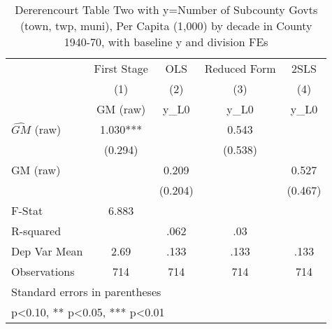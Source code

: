 \begin{table}[htbp]\centering
\def\sym#1{\ifmmode^{#1}\else\(^{#1}\)\fi}
\caption{Dererencourt Table Two with y=Number of Subcounty Govts (town, twp, muni), Per Capita (1,000) by decade in County 1940-70, with baseline y and division FEs}
\begin{tabular}{l*{4}{c}}
\toprule
                    & First Stage   &         OLS   &Reduced Form   &        2SLS   \\
                    &\multicolumn{1}{c}{(1)}&\multicolumn{1}{c}{(2)}&\multicolumn{1}{c}{(3)}&\multicolumn{1}{c}{(4)}\\
                    &\multicolumn{1}{c}{GM  (raw)}&\multicolumn{1}{c}{y\_L0}&\multicolumn{1}{c}{y\_L0}&\multicolumn{1}{c}{y\_L0}\\
\midrule
$\hat{GM}$ (raw)    &       1.030***&               &       0.543   &               \\
                    &     (0.294)   &               &     (0.538)   &               \\
\addlinespace
GM  (raw)           &               &       0.209   &               &       0.527   \\
                    &               &     (0.204)   &               &     (0.467)   \\
\midrule
F-Stat              &       6.883   &               &               &               \\
R-squared           &               &        .062   &         .03   &               \\
Dep Var Mean        &        2.69   &        .133   &        .133   &        .133   \\
Observations        &         714   &         714   &         714   &         714   \\
\bottomrule
\multicolumn{5}{l}{\footnotesize Standard errors in parentheses}\\
\multicolumn{5}{l}{\footnotesize * p<0.10, ** p<0.05, *** p<0.01}\\
\end{tabular}
\end{table}
